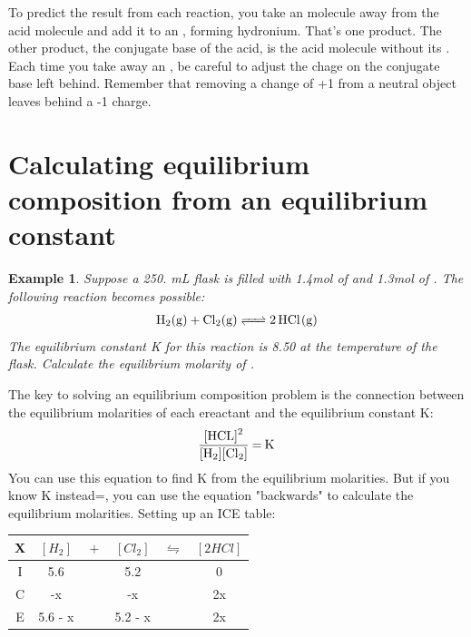 \documentclass{article}  %
\newtheorem{exmp}{Example}
\begin{document}
To predict the result from each reaction, you take an  molecule away from the acid molecule and add it to an , forming hydronium. That's one product. The other product, the conjugate base of the acid, is the acid molecule without its .
\newline
Each time you take away an , be careful to adjust the chage on the conjugate base left behind. Remember that removing a change of +1 from a neutral object leaves behind a -1 charge.

\section*{Calculating equilibrium composition from an equilibrium constant}
\begin{exmp}
    Suppose a 250. mL flask is filled with 1.4mol of  and 1.3mol of . The following reaction becomes possible:
    \begin{equation*}
        \begin{aligned}
            \ce{H2_(g) + Cl2_(g) <=> 2HCl_(g)}
        \end{aligned}
    \end{equation*}
    The equilibrium constant K for this reaction is 8.50 at the temperature of the flask. Calculate the equilibrium molarity of .
\end{exmp}
The key to solving an equilibrium composition problem is the connection between the equilibrium molarities of each ereactant and the equilibrium constant K:
\begin{equation*}
    \begin{aligned}
        \ce{\frac{[HCL]^2}{[H2][Cl2]} = K}
    \end{aligned}
\end{equation*}
You can use this equation to find K from the equilibrium molarities. But if you know K instead=, you can use the equation "backwards" to calculate the equilibrium molarities.
\newline
Setting up an ICE table:
\newline
\begin{tabular}{c|c@{}c@{}c@{}c@{}c}
    \hline
    X   &   $[H_2]$ & ${}+{}$ & $[Cl_2]$ & ${}\leftrightharpoons{}$ & $[2HCl]$ \\
    \hline
    I   &       5.6       &&   5.2                            &&  0       \\
    C   &       -x      &&   -x                           &&  2x      \\
    E   &       5.6 - x     &&   5.2 - x                        &&  2x      \\
    \hline
\end{tabular}
\end{document}
